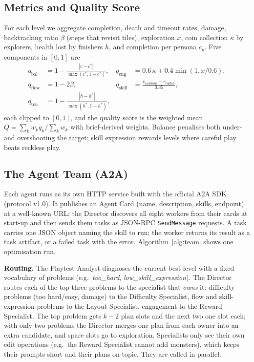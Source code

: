 \documentclass[conference]{IEEEtran}
\begin{document}
\subsection{Metrics and Quality Score}
For each level we aggregate completion, death and timeout rates, damage, backtracking ratio $\beta$
(steps that revisit tiles), exploration $x$, coin collection $\kappa$ by explorers, health lost by
finishers $h$, and completion per persona $c_p$. Five components in $[0,1]$ are
\begin{align*}
q_\text{bal} &= 1-\tfrac{|c-c^*|}{\max(c^*,1-c^*)}, &
q_\text{eng} &= 0.6\,\kappa + 0.4\min(1, x/0.6),\\
q_\text{flow} &= 1-2\beta, &
q_\text{skill} &= \tfrac{c_\text{cautious}-c_\text{rusher}}{0.35},\\
q_\text{ten} &= 1-\tfrac{|h-h^*|}{\max(h^*,1-h^*)}, &&
\end{align*}
each clipped to $[0,1]$, and the quality score is the weighted mean
$Q=\sum_k w_k q_k / \sum_k w_k$ with brief-derived weights. Balance penalises both under- and
overshooting the target; skill expression rewards levels where careful play beats reckless play.

\subsection{The Agent Team (A2A)}
Each agent runs as its own HTTP service built with the official A2A SDK (protocol v1.0). It
publishes an Agent Card (name, description, skills, endpoint) at a well-known URL; the Director
discovers all eight workers from their cards at start-up and then sends them tasks as JSON-RPC
\texttt{SendMessage} requests. A task carries one JSON object naming the skill to run; the worker
returns its result as a task artifact, or a failed task with the error. Algorithm~\ref{alg:team}
shows one optimisation run.

\textbf{Routing.} The Playtest Analyst diagnoses the current best level with a fixed vocabulary of
problems (e.g.\ \emph{too\_hard}, \emph{low\_skill\_expression}). The Director routes each of the top
three problems to the specialist that \emph{owns} it: difficulty problems (too hard/easy, damage) to
the Difficulty Specialist, flow and skill-expression problems to the Layout Specialist, engagement to
the Reward Specialist. The top problem gets $k-2$ plan slots and the next two one slot each; with only
two problems the Director merges one plan from each owner into an extra candidate, and spare slots go
to exploration. Specialists only see their own edit operations (e.g.\ the Reward Specialist cannot
add monsters), which keeps their prompts short and their plans on-topic. They are called in parallel.
\end{document}
